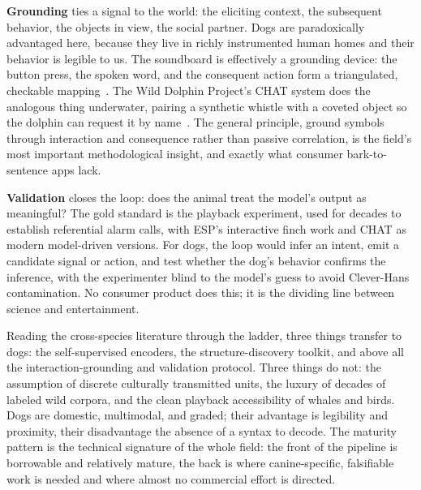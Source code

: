 \textbf{Grounding} ties a signal to the world: the eliciting context, the
subsequent behavior, the objects in view, the social partner. Dogs are
paradoxically advantaged here, because they live in richly instrumented
human homes and their behavior is legible to us. The soundboard is
effectively a grounding device: the button press, the spoken word, and the
consequent action form a triangulated, checkable
mapping~\cite{bastos2024plos,bastos2024scirep}. The Wild Dolphin Project's
CHAT system does the analogous thing underwater, pairing a synthetic
whistle with a coveted object so the dolphin can request it by
name~\cite{google2025dolphingemma}. The general principle, ground symbols
through interaction and consequence rather than passive correlation, is the
field's most important methodological insight, and exactly what consumer
bark-to-sentence apps lack.

\textbf{Validation} closes the loop: does the animal treat the model's
output as meaningful? The gold standard is the playback experiment, used
for decades to establish referential alarm calls, with ESP's interactive
finch work and CHAT as modern model-driven versions. For dogs, the loop
would infer an intent, emit a candidate signal or action, and test whether
the dog's behavior confirms the inference, with the experimenter blind to
the model's guess to avoid Clever-Hans contamination. No consumer product
does this; it is the dividing line between science and entertainment.

Reading the cross-species literature through the ladder, three things
transfer to dogs: the self-supervised encoders, the structure-discovery
toolkit, and above all the interaction-grounding and validation protocol.
Three things do not: the assumption of discrete culturally transmitted
units, the luxury of decades of labeled wild corpora, and the clean playback
accessibility of whales and birds. Dogs are domestic, multimodal, and
graded; their advantage is legibility and proximity, their disadvantage the
absence of a syntax to decode. The maturity pattern is the technical
signature of the whole field: the front of the pipeline is borrowable and
relatively mature, the back is where canine-specific, falsifiable work is
needed and where almost no commercial effort is directed.

